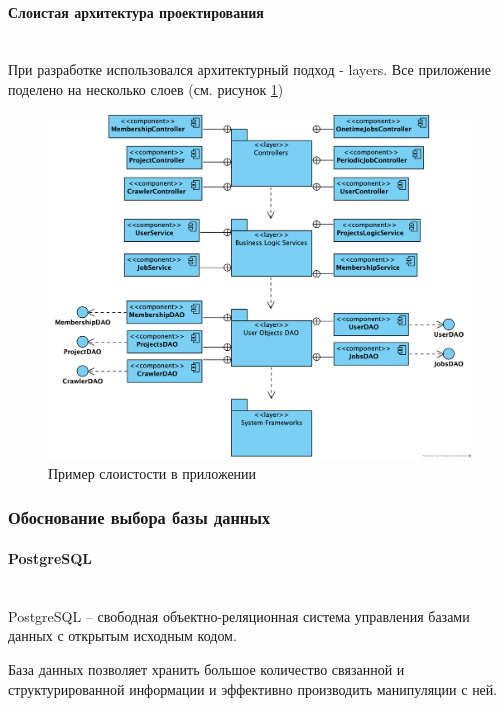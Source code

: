 \documentclass[a4paper,12pt]{article}
\begin{document}
	\paragraph{Слоистая архитектура проектирования\\ \\}
	
	При разработке использовался архитектурный подход - layers. Все приложение поделено на несколько слоев (см. рисунок \ref{pic:layers})
	
	\begin{figure}[H]
		\centering
		\includegraphics[width = 0.9\linewidth]{img/uml/ComponentDiagram.png}
		\caption{Пример слоистости в приложении}
		\label{pic:layers}
	\end{figure}
	
	\subsubsection{Обоснование выбора базы данных}
	\paragraph{PostgreSQL\\ \\}
	
	PostgreSQL\cite{postgresql} -- свободная объектно-реляционная система управления базами данных с открытым исходным кодом. 
    
    База данных позволяет хранить большое количество связанной и структурированной информации и эффективно производить манипуляции с ней. 
    
\end{document}
